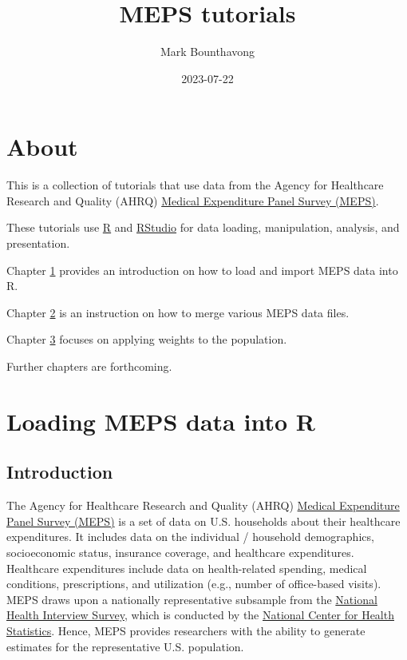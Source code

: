 \documentclass[
]{book}
\title{MEPS tutorials}
\author{Mark Bounthavong}
\date{2023-07-22}
\theoremstyle{definition}
\theoremstyle{definition}
\theoremstyle{definition}
\theoremstyle{definition}
\theoremstyle{remark}
\begin{document}
\maketitle

{
\setcounter{tocdepth}{1}
\tableofcontents
}
\hypertarget{about}{%
\chapter*{About}\label{about}}

This is a collection of tutorials that use data from the Agency for Healthcare Research and Quality (AHRQ) \href{https://meps.ahrq.gov/mepsweb/}{Medical Expenditure Panel Survey (MEPS)}.

These tutorials use \href{https://cran.r-project.org/}{R} and \href{https://posit.co/products/open-source/rstudio/}{RStudio} for data loading, manipulation, analysis, and presentation.

Chapter \protect\hyperlink{intro}{1} provides an introduction on how to load and import MEPS data into R.

Chapter \protect\hyperlink{merging}{2} is an instruction on how to merge various MEPS data files.

Chapter \protect\hyperlink{weights}{3} focuses on applying weights to the population.

Further chapters are forthcoming.

\hypertarget{intro}{%
\chapter{Loading MEPS data into R}\label{intro}}

\hypertarget{introduction}{%
\section{Introduction}\label{introduction}}

The Agency for Healthcare Research and Quality (AHRQ) \href{https://www.meps.ahrq.gov/mepsweb/}{Medical Expenditure Panel Survey (MEPS)} is a set of data on U.S. households about their healthcare expenditures. It includes data on the individual / household demographics, socioeconomic status, insurance coverage, and healthcare expenditures. Healthcare expenditures include data on health-related spending, medical conditions, prescriptions, and utilization (e.g., number of office-based visits). MEPS draws upon a nationally representative subsample from the \href{https://www.cdc.gov/nchs/nhis/index.htm?CDC_AA_refVal=https\%3A\%2F\%2Fwww.cdc.gov\%2Fnchs\%2Fnhis.htm}{National Health Interview Survey}, which is conducted by the \href{https://www.cdc.gov/nchs/index.htm}{National Center for Health Statistics}. Hence, MEPS provides researchers with the ability to generate estimates for the representative U.S. population.
\end{document}
